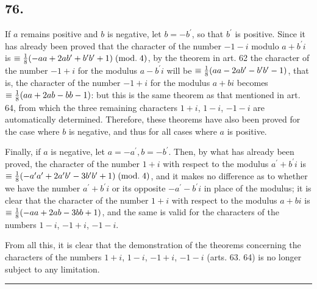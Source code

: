 \documentclass[twoside,12pt]{memoir}
\renewcommand{\pmod}[1]{\;(\textrm{mod.}\;#1)}
\let\oldfrac\frac
\def\frac#1#2{\mathchoice{\tfrac{#1}{#2}}{\oldfrac{#1}{#2}}{\genfrac{}{}{}{2}{#1}{#2\mathstrut}}{\genfrac{}{}{}{3}{#1}{#2\mathstrut}}}
\begin{document}
\subsection*{76.}

If \(a\) remains positive and \(b\) is negative, let \(b=-b^{\prime}\), so that \(b^{\prime}\) is positive. Since it has already been proved that the character of the number \(-1-i\) modulo \(a+b^{\prime} i\) is \(\equiv \frac{1}{8}(-a a+2 a b^{\prime}+b^{\prime} b^{\prime}+1)\pmod{4}\), by the theorem in art. 62 the character of the number \(-1+i\) for the modulus \(a-b^{\prime} i\) will be \(\equiv \frac{1}{8}(a a-2 a b^{\prime}-b^{\prime} b^{\prime}-1)\), that is, the character of the number \(-1+i\) for the modulus \(a+b i\) becomes \(\equiv \frac{1}{8}(a a+2 a b-b b-1)\): but this is the same theorem as that mentioned in art. 64, from which the three remaining characters \(1+i\), \(1-i\), \(-1-i\) are automatically determined. Therefore, these theorems have also been proved for the case where \(b\) is negative, and thus for all cases where \(a\) is positive.

Finally, if \(a\) is negative, let \(a=-a^{\prime}, b=-b^{\prime}\).  Then, by what has already been proved, the character of the number \(1+i\) with respect to the modulus \(a^{\prime}+b^{\prime} i\) is \(\equiv \frac{1}{8}(-a^{\prime} a^{\prime}+2 a^{\prime} b^{\prime}-3 b^{\prime} b^{\prime}+1)\pmod{4}\), and it makes no difference as to whether we have the number \(a^{\prime}+b^{\prime} i\) or its opposite \(-a^{\prime}-b^{\prime} i\) in place of the modulus; it is clear that the character of the number \(1+i\) with respect to the modulus \(a+b i\) is \(\equiv \frac{1}{8}(-a a+2 a b-3 b b+1)\), and the same is valid for the characters of the numbers \(1-i\), \(-1+i\), \(-1-i\).

From all this, it is clear that the demonstration of the theorems concerning the characters of the numbers \(1+i\), \(1-i\), \(-1+i\), \(-1-i\) (arts. 63. 64) is no longer subject to any limitation.

\begin{center}\rule{1.5in}{0.5pt}\end{center}
\end{document}
